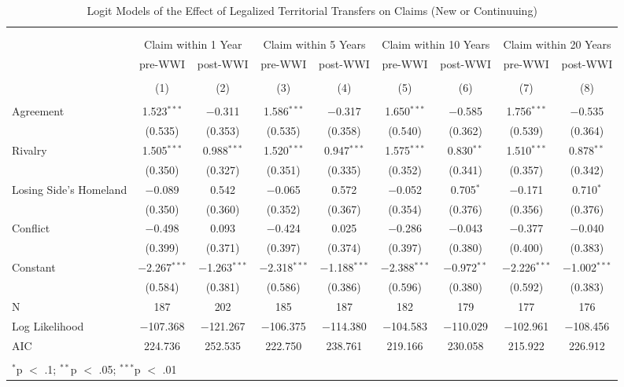 \documentclass{article}
\begin{document}
\begin{table}[!htbp] \centering 
  \caption{Logit Models of the Effect of Legalized Territorial Transfers on Claims (New or Continuuing)} 
  \label{} 
\begin{tabular}{@{\extracolsep{5pt}}lcccccccc} 
\\[-1.8ex]\hline \\[-1.8ex] 
\\[-1.8ex] & \multicolumn{2}{c}{Claim within 1 Year} & \multicolumn{2}{c}{Claim within 5 Years} & \multicolumn{2}{c}{Claim within 10 Years} & \multicolumn{2}{c}{Claim within 20 Years} \\ 
 & pre-WWI & post-WWI & pre-WWI & post-WWI & pre-WWI & post-WWI & pre-WWI & post-WWI \\ 
\\[-1.8ex] & (1) & (2) & (3) & (4) & (5) & (6) & (7) & (8)\\ 
\hline \\[-1.8ex] 
 Agreement & 1.523$^{***}$ & $-$0.311 & 1.586$^{***}$ & $-$0.317 & 1.650$^{***}$ & $-$0.585 & 1.756$^{***}$ & $-$0.535 \\ 
  & (0.535) & (0.353) & (0.535) & (0.358) & (0.540) & (0.362) & (0.539) & (0.364) \\ 
  Rivalry & 1.505$^{***}$ & 0.988$^{***}$ & 1.520$^{***}$ & 0.947$^{***}$ & 1.575$^{***}$ & 0.830$^{**}$ & 1.510$^{***}$ & 0.878$^{**}$ \\ 
  & (0.350) & (0.327) & (0.351) & (0.335) & (0.352) & (0.341) & (0.357) & (0.342) \\ 
  Losing Side's Homeland & $-$0.089 & 0.542 & $-$0.065 & 0.572 & $-$0.052 & 0.705$^{*}$ & $-$0.171 & 0.710$^{*}$ \\ 
  & (0.350) & (0.360) & (0.352) & (0.367) & (0.354) & (0.376) & (0.356) & (0.376) \\ 
  Conflict & $-$0.498 & 0.093 & $-$0.424 & 0.025 & $-$0.286 & $-$0.043 & $-$0.377 & $-$0.040 \\ 
  & (0.399) & (0.371) & (0.397) & (0.374) & (0.397) & (0.380) & (0.400) & (0.383) \\ 
  Constant & $-$2.267$^{***}$ & $-$1.263$^{***}$ & $-$2.318$^{***}$ & $-$1.188$^{***}$ & $-$2.388$^{***}$ & $-$0.972$^{**}$ & $-$2.226$^{***}$ & $-$1.002$^{***}$ \\ 
  & (0.584) & (0.381) & (0.586) & (0.386) & (0.596) & (0.380) & (0.592) & (0.383) \\ 
 N & 187 & 202 & 185 & 187 & 182 & 179 & 177 & 176 \\ 
Log Likelihood & $-$107.368 & $-$121.267 & $-$106.375 & $-$114.380 & $-$104.583 & $-$110.029 & $-$102.961 & $-$108.456 \\ 
AIC & 224.736 & 252.535 & 222.750 & 238.761 & 219.166 & 230.058 & 215.922 & 226.912 \\ 
\hline \\[-1.8ex] 
\multicolumn{9}{l}{$^{*}$p $<$ .1; $^{**}$p $<$ .05; $^{***}$p $<$ .01} \\ 
\end{tabular} 
\end{table} 
\end{document}

